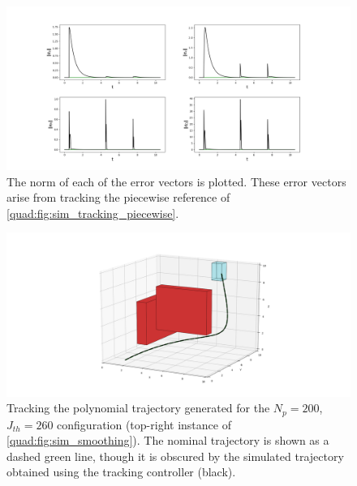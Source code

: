 \begin{figure}
    \hspace*{-4.2cm}
    \centering
    \includegraphics[scale=0.5]{./figures/sim_tracking_piecewise_errors}
    \caption[Quadrotor tracking errors]{The norm of each of the error vectors is plotted. These error vectors arise from tracking the piecewise reference of \autoref{quad:fig:sim_tracking_piecewise}.}
\label{quad:fig:sim_tracking_piecewise_errors}
\end{figure}

\begin{figure}
    \hspace*{-4.7cm}
    \centering
    \includegraphics[scale=0.5]{./figures/sim_tracking}
    \caption[Quadrotor smooth path tracking]{Tracking the polynomial trajectory generated for the $N_p = 200$, $J_{th}=260$ configuration (top-right instance of \autoref{quad:fig:sim_smoothing}). The nominal trajectory is shown as a dashed green line, though it is obscured by the simulated trajectory obtained using the tracking controller (black).}
\label{quad:fig:sim_tracking}
\end{figure}




